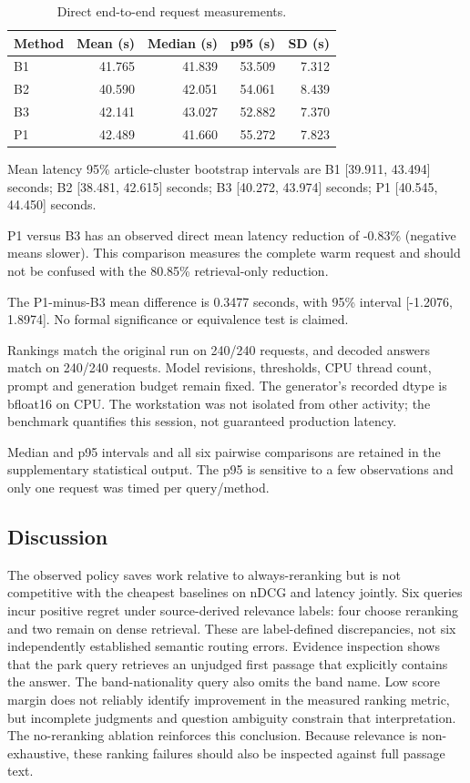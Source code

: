\documentclass[10pt,a4paper]{article}
\begin{document}
\begin{table}[t]
\centering
\caption{Direct end-to-end request measurements.}\label{tab:3}
\small\setlength{\tabcolsep}{3pt}
\begin{tabular}{lrrrr}
\toprule
Method & Mean (s) & Median (s) & p95 (s) & SD (s) \\
\midrule
B1 & 41.765 & 41.839 & 53.509 & 7.312 \\
B2 & 40.590 & 42.051 & 54.061 & 8.439 \\
B3 & 42.141 & 43.027 & 52.882 & 7.370 \\
P1 & 42.489 & 41.660 & 55.272 & 7.823 \\
\bottomrule
\end{tabular}
\end{table}


Mean latency 95\% article-cluster bootstrap intervals are B1 {[}39.911,
43.494{]} seconds; B2 {[}38.481, 42.615{]} seconds; B3 {[}40.272,
43.974{]} seconds; P1 {[}40.545, 44.450{]} seconds.

P1 versus B3 has an observed direct mean latency reduction of -0.83\%
(negative means slower). This comparison measures the complete warm
request and should not be confused with the 80.85\% retrieval-only
reduction.

The P1-minus-B3 mean difference is 0.3477 seconds, with 95\% interval
{[}-1.2076, 1.8974{]}. No formal significance or equivalence test is
claimed.

Rankings match the original run on 240/240 requests, and decoded answers
match on 240/240 requests. Model revisions, thresholds, CPU thread
count, prompt and generation budget remain fixed. The generator's
recorded dtype is bfloat16 on CPU. The workstation was not isolated from
other activity; the benchmark quantifies this session, not guaranteed
production latency.

Median and p95 intervals and all six pairwise comparisons are retained
in the supplementary statistical output. The p95 is sensitive to a few
observations and only one request was timed per query/method.

\hypertarget{discussion}{%
\subsection{Discussion}\label{discussion}}

The observed policy saves work relative to always-reranking but is not
competitive with the cheapest baselines on nDCG and latency jointly. Six
queries incur positive regret under source-derived relevance labels:
four choose reranking and two remain on dense retrieval. These are
label-defined discrepancies, not six independently established semantic
routing errors. Evidence inspection shows that the park query retrieves
an unjudged first passage that explicitly contains the answer. The
band-nationality query also omits the band name. Low score margin does
not reliably identify improvement in the measured ranking metric, but
incomplete judgments and question ambiguity constrain that
interpretation. The no-reranking ablation reinforces this conclusion.
Because relevance is non-exhaustive, these ranking failures should also
be inspected against full passage text.
\end{document}
